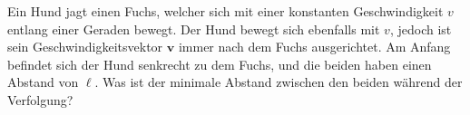 \begin{Exercise}[origin = Jaan Kalda, title = Fuchsjagd, difficulty = 4, label = fox]
	Ein Hund jagt einen Fuchs, welcher sich mit einer konstanten Geschwindigkeit $v$ entlang einer Geraden bewegt. Der Hund bewegt sich ebenfalls mit $v$, jedoch ist sein Geschwindigkeitsvektor $\mathbf{v}$ immer nach dem Fuchs ausgerichtet. Am Anfang befindet sich der Hund senkrecht zu dem Fuchs, und die beiden haben einen Abstand von $\ell$. Was ist der minimale Abstand zwischen den beiden während der Verfolgung?
\end{Exercise}